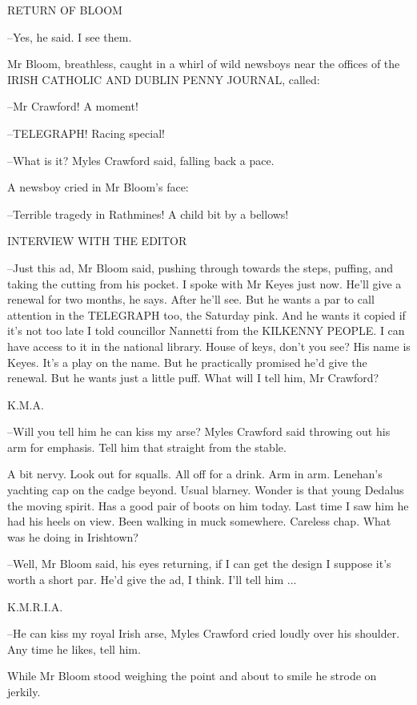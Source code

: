     RETURN OF BLOOM


--Yes, he said. I see them.

Mr Bloom, breathless, caught in a whirl of wild newsboys near the
offices of the IRISH CATHOLIC AND DUBLIN PENNY JOURNAL, called:

--Mr Crawford! A moment!

--TELEGRAPH! Racing special!

--What is it? Myles Crawford said, falling back a pace.

A newsboy cried in Mr Bloom's face:

--Terrible tragedy in Rathmines! A child bit by a bellows!



    INTERVIEW WITH THE EDITOR


--Just this ad, Mr Bloom said, pushing through towards the steps,
puffing, and taking the cutting from his pocket. I spoke with Mr Keyes
just now. He'll give a renewal for two months, he says. After he'll see.
But he wants a par to call attention in the TELEGRAPH too, the Saturday
pink. And he wants it copied if it's not too late I told councillor
Nannetti from the KILKENNY PEOPLE. I can have access to it in the national
library. House of keys, don't you see? His name is Keyes. It's a play on
the name. But he practically promised he'd give the renewal. But he wants
just a little puff. What will I tell him, Mr Crawford?



    K.M.A.


--Will you tell him he can kiss my arse? Myles Crawford said throwing out
his arm for emphasis. Tell him that straight from the stable.

A bit nervy. Look out for squalls. All off for a drink. Arm in arm.
Lenehan's yachting cap on the cadge beyond. Usual blarney. Wonder is
that young Dedalus the moving spirit. Has a good pair of boots on him
today. Last time I saw him he had his heels on view. Been walking in muck
somewhere. Careless chap. What was he doing in Irishtown?

--Well, Mr Bloom said, his eyes returning, if I can get the design I
suppose it's worth a short par. He'd give the ad, I think. I'll tell
him ...


    K.M.R.I.A.


--He can kiss my royal Irish arse, Myles Crawford cried loudly over his
shoulder. Any time he likes, tell him.

While Mr Bloom stood weighing the point and about to smile he strode
on jerkily.


